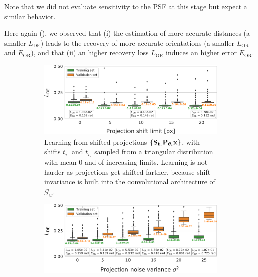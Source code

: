 Note that we did not evaluate sensitivity to the PSF at this stage but expect a similar behavior.

Here again (), we observed that (i) the estimation of more accurate distances (a smaller $L_\text{DE}$) leads to the recovery of more accurate orientations (a smaller $L_\text{OR}$ and $E_\text{OR}$), and that (ii) an higher recovery loss $L_\text{OR}$ induces an higher error $E_\text{OR}$.

\begin{figure}[ht!]
    \centering
    \begin{subfigure}[t]{0.47\linewidth}
        \includegraphics[width=\linewidth]{figures/de_translation_nums}
        \caption{%
            Learning from shifted projections $\{ \mathbf{S}_{\mathbf{t}_i} \mathbf{P}_{{\boldsymbol{\theta}}_i} \mathbf{x} \}$, with shifts $t_{i_1}$ and $t_{i_2}$ sampled from a triangular distribution with mean 0 and of increasing limits.
            Learning is not harder as projections get shifted farther, because shift invariance is built into the convolutional architecture of $\mathcal{G}_w$.
    }\label{fig:results:distance-estimation:shift}
    \end{subfigure}
    \hfill
    \begin{subfigure}[t]{0.47\linewidth}
        \includegraphics[width=\linewidth]{figures/de_noises_nums}

\end{subfigure}
\end{figure}
